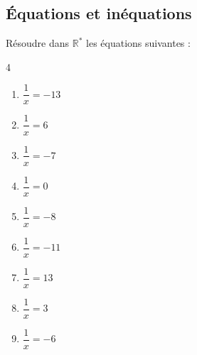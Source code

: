 {\subsection*{Équations et inéquations}


\begin{Exercice}
Résoudre dans $\mathbb{R}^*$ les équations suivantes :
\vspace{-0.5cm}
\begin{multicols}{4}

\begin{enumerate}[itemsep=1em]
	\item \begin{minipage}[t]{\linewidth}$\dfrac{1}{x}=-13$\\\end{minipage}
	\item \begin{minipage}[t]{\linewidth}$\dfrac{1}{x}=6$\\\end{minipage}
	\item \begin{minipage}[t]{\linewidth}$\dfrac{1}{x}=-7$\\\end{minipage}
	\item \begin{minipage}[t]{\linewidth}$\dfrac{1}{x}=0$\\\end{minipage}
	\item \begin{minipage}[t]{\linewidth}$\dfrac{1}{x}=-8$\\\end{minipage}
	\item \begin{minipage}[t]{\linewidth}$\dfrac{1}{x}=-11$\\\end{minipage}
	\item \begin{minipage}[t]{\linewidth}$\dfrac{1}{x}=13$\\\end{minipage}
	\item \begin{minipage}[t]{\linewidth}$\dfrac{1}{x}=3$\\\end{minipage}
	\item \begin{minipage}[t]{\linewidth}$\dfrac{1}{x}=-6$\\\end{minipage}

\end{enumerate}
\end{multicols}
\end{Exercice}}
